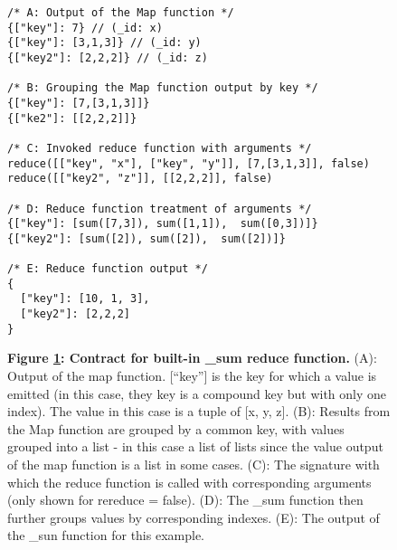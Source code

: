 \begin{figure}[H]
  \centering
  \begin{mdframed}[rightline=true,leftline=true]
    \begin{verbatim}
/* A: Output of the Map function */
{["key"]: 7} // (_id: x)
{["key"]: [3,1,3]} // (_id: y)
{["key2"]: [2,2,2]} // (_id: z)

/* B: Grouping the Map function output by key */
{["key"]: [7,[3,1,3]]}
{["ke2"]: [[2,2,2]]}

/* C: Invoked reduce function with arguments */
reduce([["key", "x"], ["key", "y"]], [7,[3,1,3]], false)
reduce([["key2", "z"]], [[2,2,2]], false)

/* D: Reduce function treatment of arguments */
{["key"]: [sum([7,3]), sum([1,1]),  sum([0,3])]}
{["key2"]: [sum([2]), sum([2]),  sum([2])]}

/* E: Reduce function output */
{
  ["key"]: [10, 1, 3],
  ["key2"]: [2,2,2]
}
    \end{verbatim}
  \end{mdframed}
  \caption[\_sum function contract]{\textbf{Figure \ref{fig-sum-reduce-fn}: Contract for built-in \_sum reduce function.} (A): Output of the map function. [``key''] is the key for which a value is emitted (in this case, they key is a compound key but with only one index). The value in this case is a tuple of [x, y, z]. (B): Results from the Map function are grouped by a common key, with values grouped into a list - in this case a list of lists since the value output of the map function is a list in some cases. (C): The signature with which the reduce function is called with corresponding arguments (only shown for rereduce = false). (D): The \_sum function then further groups values by corresponding indexes. (E): The output of the \_sun function for this example.}
  \label{fig-sum-reduce-fn}
\end{figure}